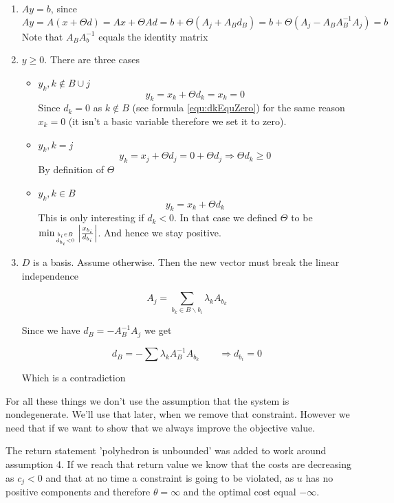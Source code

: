 \begin{enumerate}
\item $Ay=b$, since 
\[Ay=A(x+\Theta d) = Ax + \Theta Ad = b+\Theta(A_j+A_Bd_B) = b+\Theta(A_j - A_BA_B^{-1}A_j) = b\]
Note that $A_BA_b^{-1}$ equals the identity matrix
\item $y\geq 0$. There are three cases

\begin{itemize}

\item $y_k, k\not \in B\cup j$
\[y_k=x_k+\Theta d_k = x_k = 0\]
Since $d_k=0$ as $k \not \in B$ (see formula \ref{equ:dkEquZero}) for the same reason $x_k=0$ (it isn't a basic variable therefore we set it to zero). 

\item $y_k, k=j$
\[ y_k = x_j + \Theta d_j = 0 + \Theta d_j \Rightarrow  \Theta d_k \geq 0\]
By definition of $\Theta$ %

\item $y_k,k\in B$
\[y_k=x_k+\Theta d_k\]
This is only interesting if $d_k<0$. In that case we defined $\Theta$ to be $\min_{{b_i\in B}\atop {d_{b_i} <0}} \left| \frac{x_{b_i}}{d_{b_i}}\right |$. And hence we stay positive.

\end{itemize}

\item $D$ is a basis. Assume otherwise. Then the new vector must break the linear independence

\[A_j= \sum_{b_k\in B\backslash b_i} \lambda_k A_{b_k}\]

Since we have $d_B=-A_B^{-1}A_j$ we get

\[d_B = -\sum \lambda_k A_B^{-1} A_{b_k} \qquad \Rightarrow d_{b_i} = 0\] %

Which is a contradiction %
\end{enumerate}

For all these things we don't use the assumption that the system is nondegenerate. We'll use that later, when we remove that constraint. However we need that if we want to show that we always improve the objective value.

The return statement 'polyhedron is unbounded' was added to work around assumption 4. If we reach that return value we know that the costs are decreasing as $c_j < 0$ and that at no time a constraint is going to be violated, as $u$ has no positive components and therefore $\theta=\infty$ and the optimal cost equal $-\infty$.

